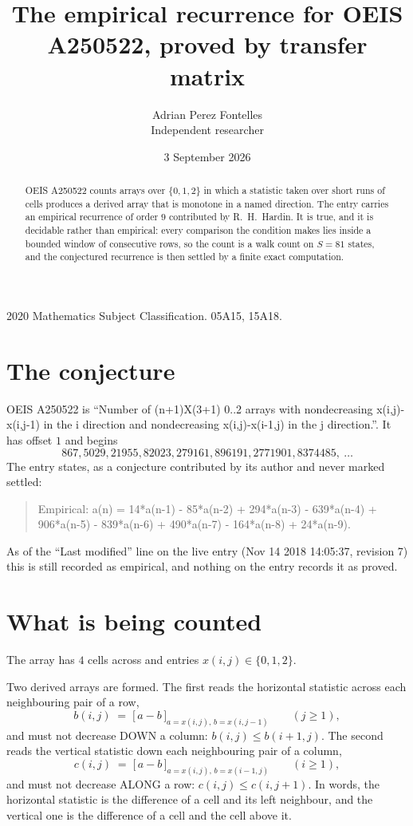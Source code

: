 \documentclass[11pt,a4paper]{article}
\title{The empirical recurrence for OEIS A250522, proved by transfer matrix}
\author{Adrian Perez Fontelles\\ \small Independent researcher}
\date{3 September 2026}
\theoremstyle{plain}
\theoremstyle{definition}
\begin{document}
\maketitle

\begin{abstract}
OEIS A250522 counts arrays over $\{0,1,2\}$ in which a statistic taken over short runs
of cells produces a derived array that is monotone in a named direction. The entry carries an
empirical recurrence of order $9$ contributed by R.~H.~Hardin. It is true, and it is
decidable rather than empirical: every comparison the condition makes lies inside a bounded
window of consecutive rows, so the count is a walk count on $S=81$ states, and the
conjectured recurrence is then settled by a finite exact computation.
\end{abstract}

\noindent\small 2020 Mathematics Subject Classification. 05A15, 15A18.\normalsize

\section{The conjecture}

OEIS A250522 is ``Number of (n+1)X(3+1) 0..2 arrays with nondecreasing x(i,j)-x(i,j-1) in the i direction and nondecreasing x(i,j)-x(i-1,j) in the j direction.''. It has offset $1$ and begins
\[
867, 5029, 21955, 82023, 279161, 896191, 2771901, 8374485,\ \dots
\]
The entry states, as a conjecture contributed by its author and never marked settled:
\begin{quote}
Empirical: a(n) = 14*a(n-1) - 85*a(n-2) + 294*a(n-3) - 639*a(n-4) + 906*a(n-5) - 839*a(n-6) + 490*a(n-7) - 164*a(n-8) + 24*a(n-9).
\end{quote}
As of the ``Last modified'' line on the live entry (Nov 14 2018 14:05:37, revision 7) this is still
recorded as empirical, and nothing on the entry records it as proved.

\section{What is being counted}

The array has $4$ cells across and entries $x(i,j)\in\{0,1,2\}$.

Two derived arrays are formed. The first reads the horizontal statistic across each
neighbouring pair of a row,
\[
b(i,j)\;=\;\bigl[\,a-b\,\bigr]_{a=x(i,j),\,b=x(i,j-1)}\qquad (j\ge1),
\]
and must not decrease DOWN a column: $b(i,j)\le b(i{+}1,j)$. The second reads the vertical
statistic down each neighbouring pair of a column,
\[
c(i,j)\;=\;\bigl[\,a-b\,\bigr]_{a=x(i,j),\,b=x(i{-}1,j)}\qquad (i\ge1),
\]
and must not decrease ALONG a row: $c(i,j)\le c(i,j{+}1)$. In words, the horizontal statistic
is the difference of a cell and its left neighbour, and the vertical one is
the difference of a cell and the cell above it.
\end{document}
